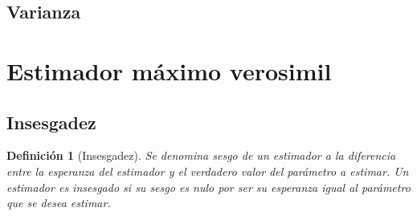 \documentclass[a4paper, 10pt]{article} %
\newtheorem{definition}{Definición}[section]
\begin{document}
\subsection{Varianza}

\section{Estimador máximo verosimil}

\subsection{Insesgadez}
\begin{definition}[Insesgadez]
Se denomina sesgo de un estimador a la diferencia entre la esperanza del estimador y el verdadero valor del parámetro a estimar. Un estimador es insesgado si su sesgo es nulo por ser su esperanza igual al parámetro que se desea estimar.
\end{definition}
\end{document}
